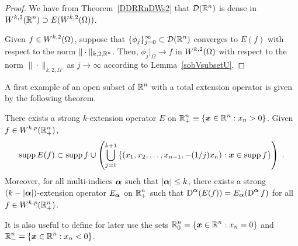 \begin{proof}
We have from Theorem~\ref{DDRRnDWs2} that $\mathcal{D}(\mathbb{R}^n)$ is dense in
$\displaystyle W^{k,2}(\mathbb{R}^n) \supset E(W^{k,2}(\Omega))$.

Given $\displaystyle f\in W^{k,2}(\Omega)$, suppose that
$\displaystyle \{\phi_j\}_{j=0}^\infty \subset \mathcal{D}(\mathbb{R}^n)$ converges
to $E(f)$ with respect to the norm $\|\cdot\|_{k,2,\mathbb{R}^n}$.  Then,
$\phi_j\big|_\Omega \rightarrow f$ in
$\displaystyle W^{k,2}(\Omega)$ with respect
to the norm $\|\cdot\|_{k,2,\Omega}$ as $j\rightarrow \infty$
according to Lemma~\ref{sobVsubsetU}.
\end{proof}

A first example of an open subset of $\displaystyle \mathbb{R}^n$ with a
total extension operator is given by the following theorem.

\begin{theorem} \label{sob_Rp_ext}
There exists a strong $k$-extension operator $E$ on
$\displaystyle \mathbb{R}^n_+ \equiv \{ {\bm{x}} \in \mathbb{R}^n : x_n>0 \}$.
Given $\displaystyle f \in W^{k,p}(\mathbb{R}^n_+)$,
\[
\operatorname{supp} E(f) \subset \operatorname{supp} f \cup 
\left( \bigcup_{j=1}^{k+1} \left\{
(x_1,x_2,\ldots,x_{n-1},-(1/j)x_n): {\bm{x}} \in \operatorname{supp} f \right\} \right) \ .
\]
Moreover, for all multi-indices ${\bm{\alpha}}$ such that $|{\bm{\alpha}}|\leq k$,
there exists a strong $(k-|{\bm{\alpha}}|)$-extension operator
$E_{{\bm{\alpha}}}$ on
$\displaystyle \mathbb{R}^n_+$ such that
$\displaystyle \operatorname{D}^{{\bm{\alpha}}} (E(f)) = E_{{\bm{\alpha}}}
(\operatorname{D}^{{\bm{\alpha}}} f)$ for all $\displaystyle f \in W^{k,p}(\mathbb{R}^n_+)$.
\end{theorem}

\begin{rmk}
It is also useful to define for later use the sets
$\displaystyle \mathbb{R}^n_0 = \{ {\bm{x}} \in \mathbb{R}^n : x_n=0 \}$ and
$\displaystyle \mathbb{R}^n_- = \{ {\bm{x}} \in \mathbb{R}^n : x_n<0 \}$.
\end{rmk}

